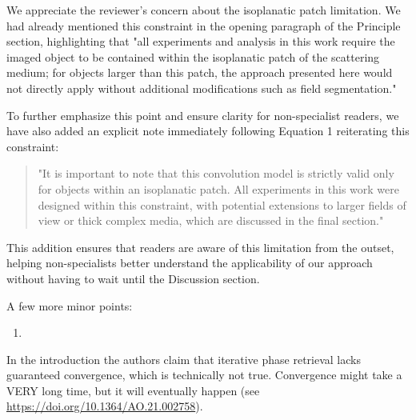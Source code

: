 \documentclass[12pt]{article}
\newcommand{\hlred}[1]{\sethlcolor{red!30}\hl{#1}}
\newenvironment{solved_reviewercomment}
    {\begin{tcolorbox}[width=\linewidth,colback=gray!5,colframe=solved_commentcolor!50,title=Reviewer Comment,left=5pt,right=5pt]}
    {\end{tcolorbox}}
\newenvironment{ourresponse}
    {\begin{tcolorbox}[width=\linewidth,breakable,enhanced,colback=gray!5,colframe=responsecolor!50,title=Response,left=5pt,right=5pt]}
    {\end{tcolorbox}}
\begin{document}
\begin{ourresponse}
    We appreciate the reviewer's concern about the isoplanatic patch limitation. We had already mentioned this constraint in the opening paragraph of the Principle section, highlighting that "all experiments and analysis in this work require the imaged object to be contained within the isoplanatic patch of the scattering medium; for objects larger than this patch, the approach presented here would not directly apply without additional modifications such as field segmentation."

    To further emphasize this point and ensure clarity for non-specialist readers, we have also added an explicit note immediately following Equation 1 reiterating this constraint:
    
    \begin{quote}
        "It is important to note that this convolution model is strictly valid only for objects within an isoplanatic patch. All experiments in this work were designed within this constraint, with potential extensions to larger fields of view or thick complex media, which are discussed in the final section."
    \end{quote}
    
    This addition ensures that readers are aware of this limitation from the outset, helping non-specialists better understand the applicability of our approach without having to wait until the Discussion section.
\end{ourresponse}



A few more minor points:

\begin{enumerate}[label=\arabic*., resume]
\item \leavevmode
\end{enumerate}
\vspace{-1em}
\begin{solved_reviewercomment}
    In the introduction the authors claim that iterative phase retrieval lacks guaranteed convergence, which is technically not true. Convergence might take a VERY long time, but it will eventually happen (see \url{https://doi.org/10.1364/AO.21.002758}).
\end{solved_reviewercomment}

\end{document}
